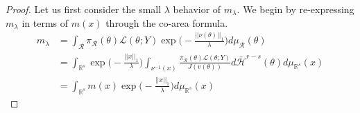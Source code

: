 \documentclass[10pt,fleqn]{article} \pdfoutput=1
\newcommand{\bb}[1]{\mathbb{#1}} \newcommand{\mc}[1]{\mathcal{#1}}
\DeclareMathOperator{\1}{\mathbbm{1}} \DeclareMathOperator{\bigO}{\mc O}
\begin{document}
\begin{proof}
%
%
%
%
%
Let us first consider the small $\lambda$ behavior of $m_\lambda.$ We begin by re-expressing $m_\lambda$ in terms of $m(x)$ through the co-area formula.
\begin{align*}
m_\lambda &= \int_\mathcal{R} \pi_\mathcal{R}(\theta) \mathcal{L}(\theta;Y) \exp\bigg(-\frac{||\nu(\theta)||_1}{\lambda}\bigg) d\mu_\mathcal{R}(\theta) \\
&= \int_{\mathbb{R}^s} \exp\bigg(-\frac{||x||_1}{\lambda}\bigg) \int_{\nu^{-1}(x)} \frac{\pi_\mathcal{R}(\theta) \mathcal{L}(\theta;Y)}{J(v(\theta))} d\bar{\mathcal{H}}^{r-s}(\theta) d\mu_{\mathbb{R}^s} (x) \\
&=\int_{\mathbb{R}^s}m(x) \exp\bigg(-\frac{||x||_1}{\lambda}\bigg)d\mu_{\mathbb{R}^s}(x)
\end{align*}


\end{proof}
\end{document}
